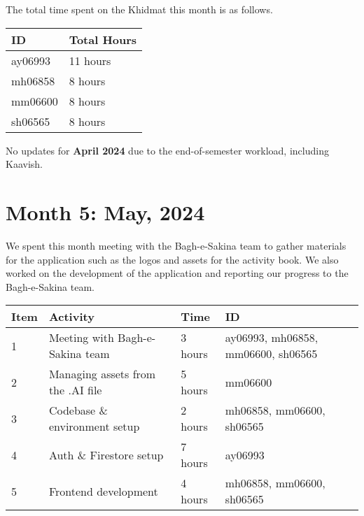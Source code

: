 \documentclass{article}
\begin{document}
\vspace{1em}

\noindent The total time spent on the Khidmat this month is as follows.

\vspace{1em}

\noindent \begin{tabular}{|l|l|} \hline
  ID & Total Hours \\ \hline
  ay06993 & 11 hours \\ \hline
  mh06858 & 8 hours \\ \hline
  mm06600 & 8 hours \\ \hline
  sh06565 & 8 hours \\ \hline
\end{tabular}

\newpage %
\noindent * No updates for \textbf{April 2024} due to the end-of-semester workload, including Kaavish.
\section*{Month 5: May, 2024}

We spent this month meeting with the Bagh-e-Sakina team to gather materials for the application such as the logos and assets for the activity book. We also worked on the development of the application and reporting our progress to the Bagh-e-Sakina team. 

\vspace{1em}

\noindent \begin{tabular}{|l|l|l|l|}
  \hline
  Item & Activity & Time   & ID \\ \hline
  1 & Meeting with Bagh-e-Sakina team & 3 hours & ay06993, mh06858, mm06600, sh06565 \\ \hline
  2 & Managing assets from the .AI file & 5 hours & mm06600 \\ \hline
  3 & Codebase \& environment setup & 2 hours  & mh06858, mm06600, sh06565 \\ \hline
  4 & Auth \& Firestore setup & 7 hours & ay06993 \\ \hline
  5 & Frontend development & 4 hours & mh06858, mm06600, sh06565 \\ \hline
\end{tabular}

\vspace{1em}
\end{document}
